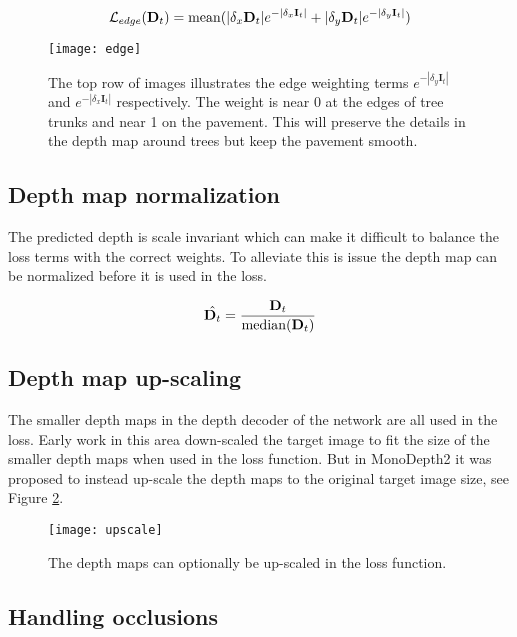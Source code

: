 \begin{equation}
\mathcal{L}_{edge}(\textbf{D}_t)=\operatorname{mean}(|\delta_x \textbf{D}_t|e^{-|\delta_x \textbf{I}_t|} + |\delta_y \textbf{D}_t|e^{-|\delta_y \textbf{I}_t|})
\end{equation}

\begin{figure}[H]
	\centering
	\texttt{[image: edge]}
	\caption{The top row of images illustrates the edge weighting terms $e^{-|\delta_y \textbf{I}_t|}$ and $e^{-|\delta_x \textbf{I}_t|}$ respectively. The weight is near 0 at the edges of tree trunks and near 1 on the pavement. This will preserve the details in the depth map around trees but keep the pavement smooth.}
	\label{fig:edge}
\end{figure}

\subsection{Depth map normalization}\label{sec:normalization}

The predicted depth is scale invariant which can make it difficult to balance the loss terms with the correct weights. To alleviate this is issue the depth map can be normalized before it is used in the loss.

\begin{equation}
\hat{\textbf{D}_t} = \frac{\textbf{D}_t}{\operatorname{median}(\textbf{D}_t)} 
\end{equation}

\subsection{Depth map up-scaling}\label{sec:upscale}

The smaller depth maps in the depth decoder of the network are all used in the loss. Early work in this area down-scaled the target image to fit the size of the smaller depth maps when used in the loss function. But in MonoDepth2\cite{monodepth2} it was proposed to instead up-scale the depth maps to the original target image size, see Figure \ref{fig:upscale}.

\begin{figure}[H]
	\centering
	\texttt{[image: upscale]}
	\caption{The depth maps can optionally be up-scaled in the loss function.}
	\label{fig:upscale}
\end{figure}

\subsection{Handling occlusions}
\label{sec:occlusion}

